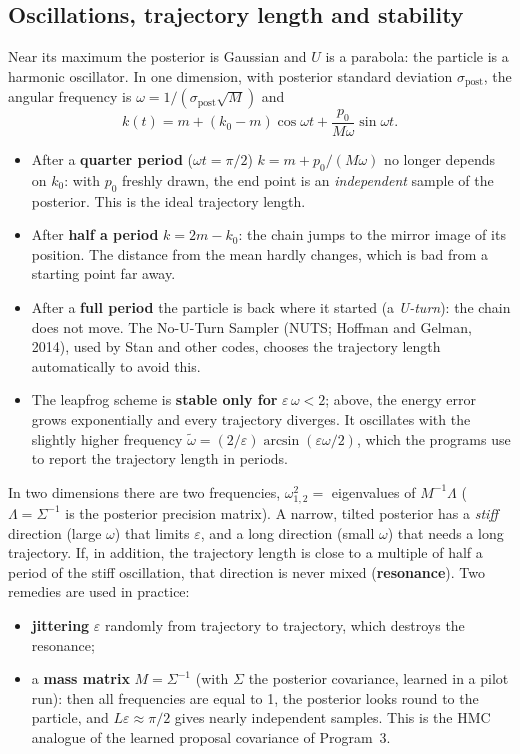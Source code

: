 \documentclass[11pt,a4paper]{article}
\begin{document}
\subsection{Oscillations, trajectory length and stability}\label{sec:osc}
Near its maximum the posterior is Gaussian and $U$ is a parabola: the particle is a harmonic oscillator. In
one dimension, with posterior standard deviation $\sigma_\text{post}$, the angular frequency is
$\omega=1/(\sigma_\text{post}\sqrt{M})$ and
\begin{equation}
  k(t) = m + (k_0-m)\cos\omega t + \frac{p_0}{M\omega}\sin\omega t .
\end{equation}
\begin{itemize}
\item After a \textbf{quarter period} ($\omega t=\pi/2$) $k=m+p_0/(M\omega)$ no longer depends on $k_0$: with
  $p_0$ freshly drawn, the end point is an \emph{independent} sample of the posterior. This is the ideal
  trajectory length.
\item After \textbf{half a period} $k=2m-k_0$: the chain jumps to the mirror image of its position. The
  distance from the mean hardly changes, which is bad from a starting point far away.
\item After a \textbf{full period} the particle is back where it started (a \emph{U-turn}): the chain does not
  move. The No-U-Turn Sampler (NUTS; Hoffman and Gelman, 2014), used by Stan and other codes, chooses the
  trajectory length automatically to avoid this.
\item The leapfrog scheme is \textbf{stable only for} $\varepsilon\,\omega<2$; above, the energy error grows
  exponentially and every trajectory diverges. It oscillates with the slightly higher frequency
  $\tilde\omega=(2/\varepsilon)\arcsin(\varepsilon\omega/2)$, which the programs use to report the trajectory
  length in periods.
\end{itemize}
In two dimensions there are two frequencies, $\omega_{1,2}^2=$ eigenvalues of $M^{-1}\Lambda$ ($\Lambda=\Sigma^{-1}$
is the posterior precision matrix). A narrow, tilted posterior has a \emph{stiff} direction (large $\omega$) that
limits $\varepsilon$, and a long direction (small $\omega$) that needs a long trajectory. If, in addition, the
trajectory length is close to a multiple of half a period of the stiff oscillation, that direction is never
mixed (\textbf{resonance}). Two remedies are used in practice:
\begin{itemize}
\item \textbf{jittering} $\varepsilon$ randomly from trajectory to trajectory, which destroys the resonance;
\item a \textbf{mass matrix} $M=\Sigma^{-1}$ (with $\Sigma$ the posterior covariance, learned in a pilot run):
  then all frequencies are equal to 1, the posterior looks round to the particle, and
  $L\varepsilon\approx\pi/2$ gives nearly independent samples. This is the HMC analogue of the learned proposal
  covariance of Program~3.
\end{itemize}
\end{document}

